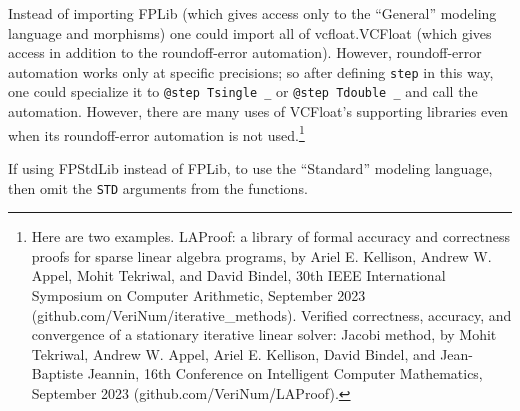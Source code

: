 \documentclass[article]{memoir}
\begin{document}
Instead of importing FPLib (which gives access only to the ``General'' modeling language and morphisms)
one could import all of vcfloat.VCFloat (which gives access in addition to the roundoff-error automation).
However, roundoff-error automation works only at specific precisions; so after defining \lstinline{step}
in this way, one could specialize it to \lstinline{@step Tsingle _} or \lstinline{@step Tdouble _}
and call the automation.  However, there are many uses of VCFloat's supporting libraries
even when its roundoff-error automation is not used.\footnote{Here are two examples.
LAProof: a library of formal accuracy and correctness proofs for sparse linear algebra programs, by Ariel E. Kellison, Andrew W. Appel, Mohit Tekriwal, and David Bindel, 30th IEEE International Symposium on Computer Arithmetic, September 2023 (github.com/VeriNum/iterative\_methods).
Verified correctness, accuracy, and convergence of a stationary iterative linear solver: Jacobi method, by Mohit Tekriwal, Andrew W. Appel, Ariel E. Kellison, David Bindel, and Jean-Baptiste Jeannin, 16th Conference on Intelligent Computer Mathematics, September 2023 (github.com/VeriNum/LAProof).}

If using FPStdLib instead of FPLib, to use the ``Standard'' modeling language,
then omit the \lstinline{STD} arguments from the functions.
\end{document}
